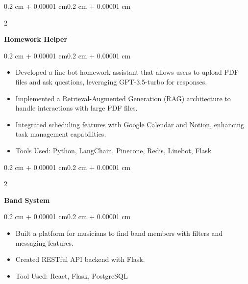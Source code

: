 \documentclass[10pt, letterpaper]{article}
\newenvironment{highlights}{
    \begin{itemize}[
        topsep=0.10 cm,
        parsep=0.10 cm,
        partopsep=0pt,
        itemsep=0pt,
        leftmargin=0.4 cm + 10pt
    ]
}{
    \end{itemize}
}
\newenvironment{onecolentry}{
    \begin{adjustwidth}{0.2 cm + 0.00001 cm}{0.2 cm + 0.00001 cm}
}{
    \end{adjustwidth}
}
\newenvironment{twocolentry}[2][]{
    \onecolentry
    \def\secondColumn{#2}
    \setcolumnwidth{\fill, 4.5 cm}
    \begin{paracol}{2}
}{
    \switchcolumn \raggedleft \secondColumn
    \end{paracol}
    \endonecolentry
}
\let\hrefWithoutArrow\href
\renewcommand{\href}[2]{\hrefWithoutArrow{#1}{\ifthenelse{\equal{#2}{}}{ }{#2 }\raisebox{.15ex}{\footnotesize \faExternalLink*}}}
\begin{document}
        \vspace{0.10 cm}
        \begin{twocolentry}{
        \textit{\href{https://github.com/ChuEating1005/Homework-Helper}{Link}}}
            \textbf{Homework Helper}
        \end{twocolentry}
        \vspace{0.10 cm}
        \begin{onecolentry}
            \begin{highlights}
                \item Developed a line bot homework assistant that allows users to upload PDF files and ask questions, leveraging GPT-3.5-turbo for responses.
                \item Implemented a Retrieval-Augmented Generation (RAG) architecture to handle interactions with large PDF files.
                \item Integrated scheduling features with Google Calendar and Notion, enhancing task management capabilities.
                \item Tools Used: Python, LangChain, Pinecone, Redis, Linebot, Flask
            \end{highlights}
        \end{onecolentry}
        
        \vspace{0.10 cm}
        \begin{twocolentry}{
        \textit{\href{https://github.com/ChuEating1005/Band-System}{Link}}}
            \textbf{Band System}
        \end{twocolentry}
        \vspace{0.10 cm}
        \begin{onecolentry}
            \begin{highlights}
                \item Built a platform for musicians to find band members with filters and messaging features.
                \item Created RESTful API backend with Flask.
                \item Tool Used: React, Flask, PostgreSQL
            \end{highlights}
        \end{onecolentry}
    
\end{document}
